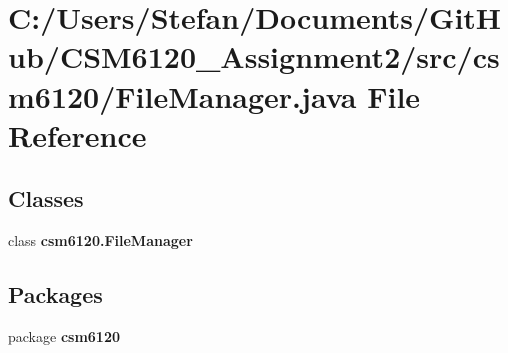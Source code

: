 \section{C\+:/\+Users/\+Stefan/\+Documents/\+Git\+Hub/\+C\+S\+M6120\+\_\+\+Assignment2/src/csm6120/\+File\+Manager.java File Reference}
\label{_file_manager_8java}
\subsection*{Classes}
\begin{DoxyCompactItemize}
\item 
class {\bf csm6120.\+File\+Manager}
\end{DoxyCompactItemize}
\subsection*{Packages}
\begin{DoxyCompactItemize}
\item 
package {\bf csm6120}
\end{DoxyCompactItemize}

